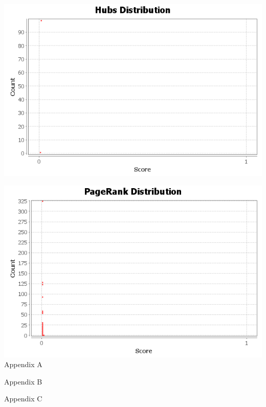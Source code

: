 \documentclass{article}
\begin{document}
\includegraphics[scale=.5]{hubs.png} \\
\graphicspath{{q3/pagerank/}}
\includegraphics[scale=.5]{pageranks.png} \\

\newpage
\appendix
Appendix A


\newpage
Appendix B


\newpage
Appendix C

\end{document}

